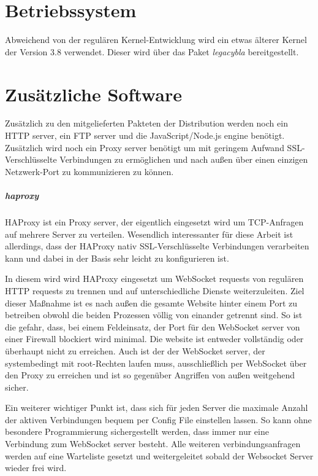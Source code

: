 \documentclass[12pt, twoside, a4paper]{scrbook}
\begin{document}
\chapter{Betriebssystem}
Abweichend von der regulären Kernel-Entwicklung wird ein etwas älterer Kernel der Version 3.8 verwendet. Dieser wird über das Paket \textit{legacybla} bereitgestellt.

\chapter{Zusätzliche Software}
Zusätzlich zu den mitgelieferten Pakteten der Distribution werden noch ein HTTP server, ein FTP server und die JavaScript/Node.js engine benötigt. Zusätzlich wird noch ein Proxy server benötigt um mit geringem Aufwand SSL-Verschlüsselte Verbindungen zu ermöglichen und nach außen über einen einzigen Netzwerk-Port zu kommunizieren zu können.

\paragraph{haproxy} HAProxy ist ein Proxy server, der eigentlich eingesetzt wird um TCP-Anfragen auf mehrere Server zu verteilen. Wesendlich interessanter für diese Arbeit ist allerdings, dass der HAProxy nativ SSL-Verschlüsselte Verbindungen verarbeiten kann und dabei in der Basis sehr leicht zu konfigurieren ist.\cite{kuehnast2014}

In diesem wird wird HAProxy eingesetzt um WebSocket requests von regulären HTTP requests zu trennen und auf unterschiedliche Dienste weiterzuleiten. Ziel dieser Maßnahme ist es nach außen die gesamte Website hinter einem Port zu betreiben obwohl die beiden Prozessen völlig von einander getrennt sind. So ist die gefahr, dass, bei einem Feldeinsatz, der Port für den WebSocket server von einer Firewall blockiert wird minimal. Die website ist entweder vollständig oder überhaupt nicht zu erreichen. Auch ist der der WebSocket server, der systembedingt mit root-Rechten laufen muss, ausschließlich per WebSocket über den Proxy zu erreichen und ist so gegenüber Angriffen von außen weitgehend sicher.

Ein weiterer wichtiger Punkt ist, dass sich für jeden Server die maximale Anzahl der aktiven Verbindungen bequem per Config File einstellen lassen. So kann ohne besondere Programmierung sichergestellt werden, dass immer nur eine Verbindung zum WebSocket server besteht. Alle weiteren verbindungsanfragen werden auf eine Warteliste gesetzt und weitergeleitet sobald der Websocket Server wieder frei wird.
\end{document}
